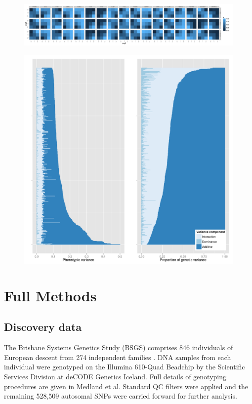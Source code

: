 \documentclass{article}
\begin{document}
\begin{figure}
	\centering
	\includegraphics[width=5in]{gpbonfrep.pdf}
	\caption{}
\end{figure}
\clearpage

\begin{figure}
	\centering
	\includegraphics[width=5in]{variance_components.pdf}
	\caption{}
\end{figure}
\clearpage

\section{Full Methods}

\subsection{Discovery data}

The Brisbane Systems Genetics Study (BSGS) comprises 846 individuals of European descent from 274 independent families \cite{pmid22563384}. DNA samples from each individual were genotyped on the Illumina 610-Quad Beadchip by the Scientific Services Division at deCODE Genetics Iceland. Full details of genotyping procedures are given in Medland et al. \cite{Medland2009} Standard QC filters were applied and the remaining 528,509 autosomal SNPs were carried forward for further analysis. 
\end{document}
